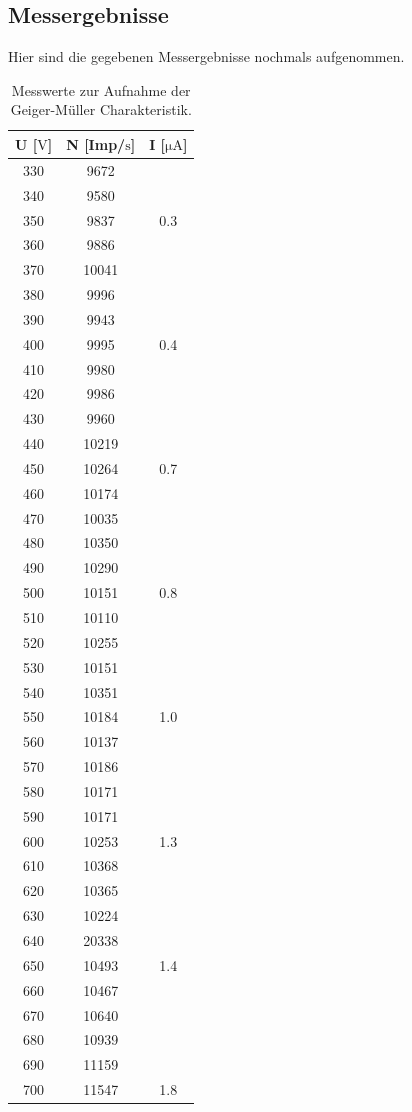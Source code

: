 \subsection{Messergebnisse}
Hier sind die gegebenen Messergebnisse nochmals aufgenommen.
\begin{table}
  \centering
  \caption{Messwerte zur Aufnahme der Geiger-Müller Charakteristik.}
  \label{tab:Messwerte}
  \begin{tabular}{c c c}
      \toprule
      {U [$\si{\volt}$]} & {N [Imp/$\si{\second}$]} & {I [$\si{\micro\ampere}$]}\\
      \midrule
      330& 9672 \\
      340& 9580 \\
      350& 9837& 0.3 \\
      360& 9886\\
      370& 10041\\
      380& 9996 \\
      390& 9943 \\
      400& 9995& 0.4 \\
      410& 9980 \\
      420& 9986 \\
      430& 9960 \\
      440& 10219\\
      450& 10264& 0.7 \\
      460& 10174 \\
      470& 10035 \\
      480& 10350 \\
      490& 10290 \\
      500& 10151& 0.8 \\
      510& 10110 \\
      520& 10255 \\
      530& 10151 \\
      540& 10351 \\
      550& 10184& 1.0 \\
      560& 10137 \\
      570& 10186 \\
      580& 10171 \\
      590& 10171 \\
      600& 10253& 1.3 \\
      610& 10368 \\
      620& 10365 \\
      630& 10224 \\
      640& 20338 \\
      650& 10493& 1.4 \\
      660& 10467\\
      670& 10640\\
      680& 10939\\
      690& 11159\\
      700& 11547& 1.8 \\
      \bottomrule
    \end{tabular}
\end{table}